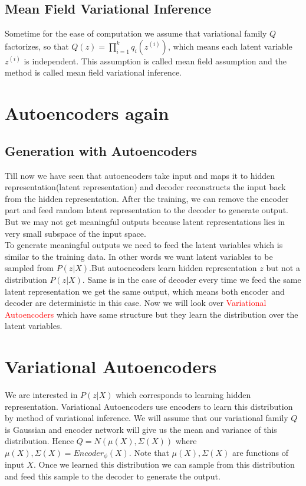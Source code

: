 \documentclass[10pt,a4paper]{article}
\begin{document}
\subsection{Mean Field Variational Inference}
Sometime for the ease of computation we assume that variational family $Q$ factorizes, so that $Q(z) = \prod_{i=1}^{k} q_i(z^{(i)})$, which means each latent variable $z^{(i)}$ is independent. This assumption is called mean field assumption and the method is called mean field variational inference. 

\section{Autoencoders again}
\subsection{Generation with Autoencoders}
Till now we have seen that autoencoders take input and maps it to hidden representation(latent representation) and decoder reconstructs the input back from the hidden representation. After the training, we can remove the encoder part and feed random latent representation to the decoder to generate output. But we may not get meaningful outputs because latent representations lies in very small subspace of the input space.\\
To generate meaningful outputs we need to feed the latent variables which is similar to the training data. In other words we want latent variables to be sampled from $P(z|X)$.But autoencoders learn hidden representation $z$ but not a distribution $P(z|X)$. Same is in the case of decoder every time we feed the same latent representation we get the same output, which means both encoder and decoder are deterministic in this case. Now we will look over \textcolor{red}{Variational Autoencoders} which have same structure but they learn the distribution over the latent variables.

\section{Variational Autoencoders}
We are interested in $P(z|X)$ which corresponds to learning hidden representation. Variational Autoencoders use encoders to learn this distribution by method of variational inference. We will assume that our variational family $Q$ is Gaussian and encoder network will give us the mean and variance of this distribution. Hence $Q = N(\mu(X), \Sigma(X))$ where $\mu(X), \Sigma(X) = Encoder_{\phi}(X)$. Note that $\mu(X), \Sigma(X)$ are functions of input $X$. Once we learned this distribution we can sample from this distribution and feed this sample to the decoder to generate the output.
\end{document}
